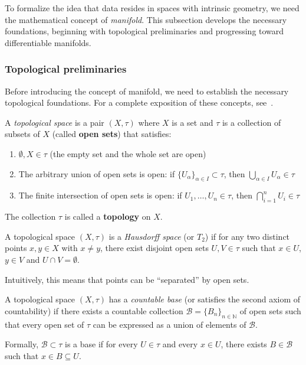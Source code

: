 To formalize the idea that data resides in spaces with intrinsic geometry, we need the mathematical concept of \textit{manifold}. This subsection develops the necessary foundations, beginning with topological preliminaries and progressing toward differentiable manifolds.

\subsubsection{Topological preliminaries}\label{subsubsec:preliminares_topologicos}

Before introducing the concept of manifold, we need to establish the necessary topological foundations. For a complete exposition of these concepts, see~\citet{munkres2000topology}.

\begin{definition}\label{def:espacio_topologico}
A \textit{topological space} is a pair $(X, \tau)$ where $X$ is a set and $\tau$ is a collection of subsets of $X$ (called \textbf{open sets}) that satisfies:
\begin{enumerate}
	\item $\emptyset, X \in \tau$ (the empty set and the whole set are open)
	\item The arbitrary union of open sets is open: if $\{U_\alpha\}_{\alpha \in I} \subset \tau$, then $\bigcup_{\alpha \in I} U_\alpha \in \tau$
	\item The finite intersection of open sets is open: if $U_1, \ldots, U_n \in \tau$, then $\bigcap_{i=1}^n U_i \in \tau$
\end{enumerate}
The collection $\tau$ is called a \textbf{topology} on $X$.
\end{definition}

\begin{definition}\label{def:espacio_hausdorff}
A topological space $(X, \tau)$ is a \textit{Hausdorff space} (or $T_2$) if for any two distinct points $x, y \in X$ with $x \neq y$, there exist disjoint open sets $U, V \in \tau$ such that $x \in U$, $y \in V$ and $U \cap V = \emptyset$.

Intuitively, this means that points can be ``separated'' by open sets.
\end{definition}

\begin{definition}\label{def:base_numerable}
A topological space $(X, \tau)$ has a \textit{countable base} (or satisfies the second axiom of countability) if there exists a countable collection $\mathcal{B} = \{B_n\}_{n \in \mathbb{N}}$ of open sets such that every open set of $\tau$ can be expressed as a union of elements of $\mathcal{B}$.

Formally, $\mathcal{B} \subset \tau$ is a base if for every $U \in \tau$ and every $x \in U$, there exists $B \in \mathcal{B}$ such that $x \in B \subseteq U$.
\end{definition}

